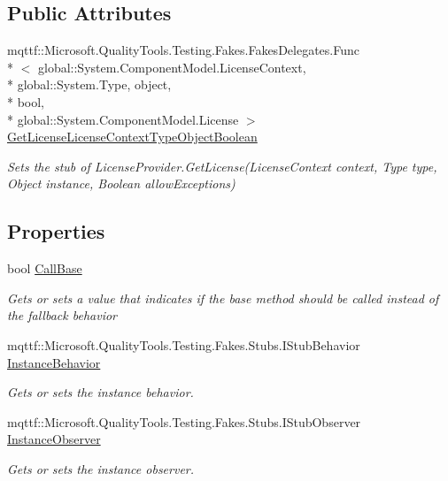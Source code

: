 \subsection*{Public Attributes}
\begin{DoxyCompactItemize}
\item 
mqttf\-::\-Microsoft.\-Quality\-Tools.\-Testing.\-Fakes.\-Fakes\-Delegates.\-Func\\*
$<$ global\-::\-System.\-Component\-Model.\-License\-Context, \\*
global\-::\-System.\-Type, object, \\*
bool, \\*
global\-::\-System.\-Component\-Model.\-License $>$ \hyperlink{class_system_1_1_component_model_1_1_fakes_1_1_stub_license_provider_a3e6c7eb364faa6a72716d1821b112bac}{Get\-License\-License\-Context\-Type\-Object\-Boolean}
\begin{DoxyCompactList}\small\item\em Sets the stub of License\-Provider.\-Get\-License(\-License\-Context context, Type type, Object instance, Boolean allow\-Exceptions)\end{DoxyCompactList}\end{DoxyCompactItemize}
\subsection*{Properties}
\begin{DoxyCompactItemize}
\item 
bool \hyperlink{class_system_1_1_component_model_1_1_fakes_1_1_stub_license_provider_a3adea9ae5c520360052d1ca08a07e190}{Call\-Base}
\begin{DoxyCompactList}\small\item\em Gets or sets a value that indicates if the base method should be called instead of the fallback behavior\end{DoxyCompactList}\item 
mqttf\-::\-Microsoft.\-Quality\-Tools.\-Testing.\-Fakes.\-Stubs.\-I\-Stub\-Behavior \hyperlink{class_system_1_1_component_model_1_1_fakes_1_1_stub_license_provider_afd13ec846504b1f2e4cd44ca08fe069c}{Instance\-Behavior}
\begin{DoxyCompactList}\small\item\em Gets or sets the instance behavior.\end{DoxyCompactList}\item 
mqttf\-::\-Microsoft.\-Quality\-Tools.\-Testing.\-Fakes.\-Stubs.\-I\-Stub\-Observer \hyperlink{class_system_1_1_component_model_1_1_fakes_1_1_stub_license_provider_ae8feeab6bebbb44246ccc3c6eb2285c8}{Instance\-Observer}
\begin{DoxyCompactList}\small\item\em Gets or sets the instance observer.\end{DoxyCompactList}\end{DoxyCompactItemize}


